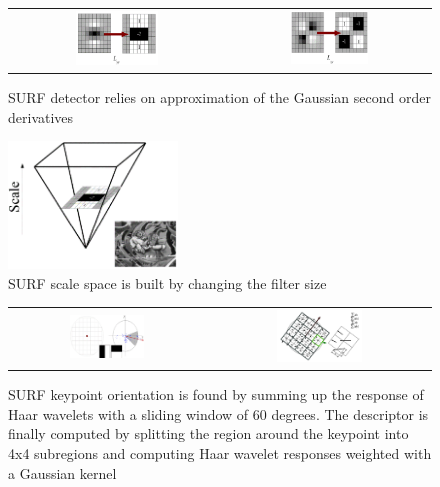 \begin{figure}[H]
\centering
 \begin{tabular}{cc}
 \includegraphics[width=0.4\textwidth]{figures/surf_lyy} &
 \includegraphics[width=0.4\textwidth]{figures/surf_lxy}
 \end{tabular}
\caption{SURF detector relies on approximation of the Gaussian second order derivatives}
\end{figure}

\begin{figure}[H]
\centering
\includegraphics[width=0.4\textwidth]{figures/surf_scale}
\caption{SURF scale space is built by changing the filter size}
\end{figure}

\begin{figure}[H]
\centering
 \begin{tabular}{cc}
 \includegraphics[width=0.4\textwidth]{figures/surf_orientation} &
 \includegraphics[width=0.4\textwidth]{figures/surf_descriptor}
\end{tabular}
\caption{SURF keypoint orientation is found by summing up the response of Haar wavelets with a sliding window of 60 degrees. The descriptor is finally computed by splitting the region around the keypoint into 4x4 subregions and computing Haar wavelet responses weighted with a Gaussian kernel}
\end{figure}

